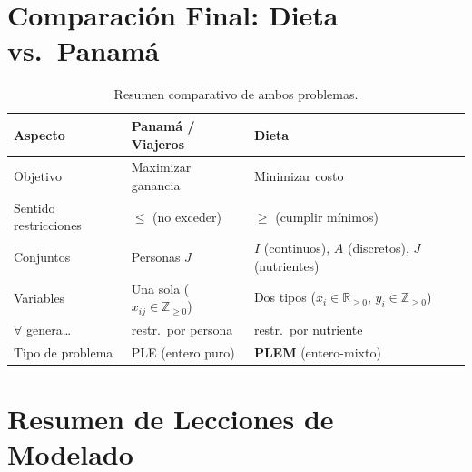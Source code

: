 \documentclass[12pt]{article}
\begin{document}
\section{Comparaci\'on Final: Dieta vs.\ Panam\'a}

\begin{table}[h]
\centering
\small
\begin{tabular}{lll}
\toprule
\textbf{Aspecto} & \textbf{Panam\'a / Viajeros} & \textbf{Dieta} \\
\midrule
Objetivo              & Maximizar ganancia       & Minimizar costo \\
Sentido restricciones & $\leq$ (no exceder)      & $\geq$ (cumplir m\'inimos) \\
Conjuntos             & Personas $J$             & $I$ (continuos), $A$ (discretos), $J$ (nutrientes) \\
Variables             & Una sola ($x_{ij} \in \mathbb{Z}_{\geq 0}$) & Dos tipos ($x_i \in \mathbb{R}_{\geq 0}$, $y_i \in \mathbb{Z}_{\geq 0}$) \\
$\forall$ genera\ldots & restr.\ por persona     & restr.\ por nutriente \\
Tipo de problema      & PLE (entero puro)        & \textbf{PLEM} (entero-mixto) \\
\bottomrule
\end{tabular}
\caption{Resumen comparativo de ambos problemas.}
\end{table}

\section{Resumen de Lecciones de Modelado}
\end{document}
